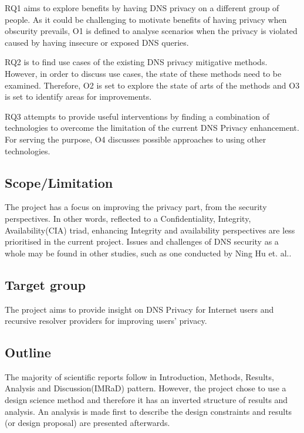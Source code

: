 \documentclass[a4paper,12pt]{article}
\begin{document}
RQ1 aims to explore benefits by having DNS privacy on a different group of people.
As it could be challenging to motivate benefits of having privacy when obscurity prevails, O1 is defined to analyse scenarios when the privacy is violated caused by having insecure or exposed DNS queries.

RQ2 is to find use cases of the existing DNS privacy mitigative methods. However, in order to discuss use cases, the state of these methods need to be examined. Therefore, O2 is set to explore the state of arts of the methods and O3 is set to identify areas for  improvements.

RQ3 attempts to provide useful interventions by finding a combination of technologies to overcome the limitation of the current DNS Privacy enhancement. For serving the purpose, O4 discusses possible approaches to using other technologies.

\subsection{Scope/Limitation}
The project has a focus on improving the privacy part, from the security perspectives. In other words, reflected to a Confidentiality, Integrity, Availability(CIA) triad, enhancing Integrity and availability perspectives are less prioritised in the current project. Issues and challenges of DNS security as a whole may be found in other studies, such as one conducted by Ning Hu et. al.\cite{ning2017dnssecurity}. 

\subsection{Target group}
The project aims to provide insight on DNS Privacy for Internet users and recursive resolver providers for improving users' privacy.

\subsection{Outline}
The majority of scientific reports follow in Introduction, Methods, Results, Analysis and Discussion(IMRaD) pattern. However, the project chose to use a design science method and therefore it has an inverted structure of results and analysis. An analysis is made first to describe the design constraints and results (or design proposal) are presented afterwards. 
\end{document}
